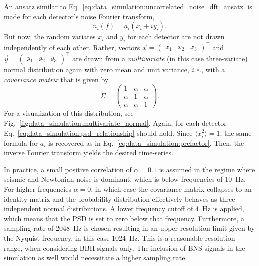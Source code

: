 An ansatz similar to Eq.~\ref{eq:data_simulation:uncorrelated_noise_dft_ansatz} is made for each detector's noise Fourier transform, 
\begin{equation}
	\tilde{n}_i(f) = a_i (x_i + iy_i).
\end{equation}
But now, the random variates $x_i$ and $y_i$ for each detector are not drawn independently of each other. Rather, vectors $\vec{x} = \begin{pmatrix} x_1 & x_2 & x_3 \end{pmatrix}^\intercal$ and $\vec{y} = \begin{pmatrix} y_1 & y_2 & y_3 \end{pmatrix}^\intercal$ are drawn from a \emph{multivariate} (in this case three-variate) normal distribution again with zero mean and unit variance, \emph{i.e.}, with a \emph{covariance matrix} that is given by
\begin{equation}
	\Sigma = \begin{pmatrix}
		1 & \alpha & \alpha \\
		\alpha & 1 & \alpha \\
		\alpha & \alpha & 1
	\end{pmatrix}.
\end{equation}
For a visualization of this distribution, see Fig.~\ref{fig:data_simulation:multivariate_normal}.
Again, for each detector Eq.~\ref{eq:data_simulation:psd_relationship} should hold. Since $\langle x_i^2\rangle = 1$, the same formula for $a_i$ is recovered as in Eq.~\ref{eq:data_simulation:prefactor}. Then, the inverse Fourier transform yields the desired time-series.

In practice, a small positive correlation of $\alpha=0.1$ is assumed in the regime where seismic and Newtonian noise is dominant, which is below frequencies of \SI{10}{\hertz}. For higher frequencies $\alpha=0$, in which case the covariance matrix collapses to an identity matrix and the probability distribution effectively behaves as three independent normal distributions. A lower frequency cutoff of \SI{4}{\hertz} is applied, which means that the PSD is set to zero below that frequency. Furthermore, a sampling rate of \SI{2048}{\hertz} is chosen resulting in an upper resolution limit given by the Nyquist frequency, in this case \SI{1024}{\hertz}.  This is a reasonable resolution range, when considering BBH signals only. The inclusion of BNS signals in the simulation as well would necessitate a higher sampling rate. 

